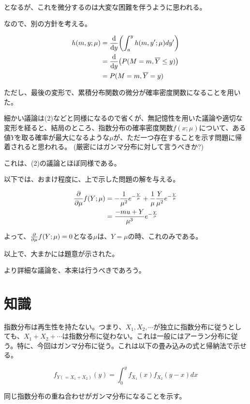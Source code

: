 \documentclass[a4paper, 10pt, dvipdfmx]{jlreq}
\begin{document}
となるが、これを微分するのは大変な困難を伴うように思われる。

なので、別の方針を考える。

\begin{align*}
  h(m,y;\mu) & =\dv{y}\qty(\int_a^y{h(m,y';\mu)}dy')  \\
             & =\dv{y}\qty(P(M=m,\overline{Y}\leq y)) \\
             & =P(M=m,\overline{Y}=y)
\end{align*}

ただし、最後の変形で、累積分布関数の微分が確率密度関数になることを用いた。

細かい議論は(2)などと同様になるので省くが、無記憶性を用いた議論や適切な変形を経ると、結局のところ、指数分布の確率密度関数$f(x;\mu)$について、ある値$Y$を取る確率が最大になるような$\mu$が、ただ一つ存在することを示す問題に帰着されると思われる。
(厳密にはガンマ分布に対して言うべきか?)

これは、(2)の議論とほぼ同様である。

以下では、おまけ程度に、上で示した問題の解を与える。

\begin{align*}
  \pdv{\mu}f(Y;\mu) & =-\frac{1}{\mu^2}e^{-\frac{Y}{\mu}}+\frac{1}{\mu}\frac{Y}{\mu^2}e^{-\frac{Y}{\mu}} \\
                    & =\frac{-mu+Y}{\mu^3}e^{-\frac{Y}{\mu}}
\end{align*}

よって、$\pdv{\mu}f(Y;\mu)=0$となる$\mu$は、$Y=\mu$の時、これのみである。

以上で、大まかには題意が示された。

より詳細な議論を、本来は行うべきであろう。

\section{知識}

指数分布は再生性を持たない。つまり、$X_1,X_2,\cdots$が独立に指数分布に従うとしても、$X_1+X_2+\cdots$は指数分布に従わない。これは一般にはアーラン分布に従う。特に、今回はガンマ分布に従う。これは以下の畳み込みの式と帰納法で示せる。

\begin{equation*}
  f_{Y(=X_1+X_2)}(y)=\int_0^{y}{f_{X_1}(x)f_{X_2}(y-x)dx}
\end{equation*}

同じ指数分布の重ね合わせがガンマ分布になることを示す。
\end{document}
